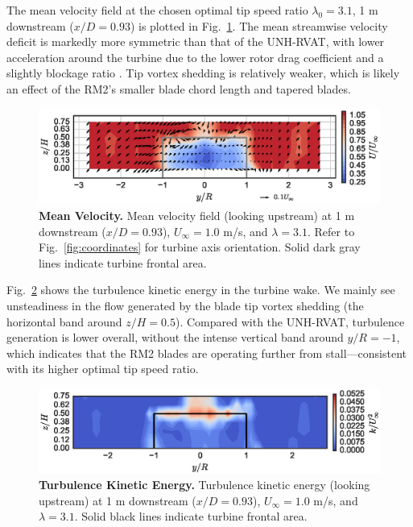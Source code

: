 \documentclass[10pt,letterpaper]{article}
\begin{document}
The mean velocity field at the chosen optimal tip speed ratio $\lambda_0=3.1$, 1
m downstream ($x/D=0.93$) is plotted in Fig.~\ref{fig:meancontquiv}. The mean
streamwise velocity deficit is markedly more symmetric than that of the
UNH-RVAT, with lower acceleration around the turbine due to the lower rotor drag
coefficient and a slightly blockage ratio \cite{Bachant2015-JoT}. Tip vortex
shedding is relatively weaker, which is likely an effect of the RM2's smaller
blade chord length and tapered blades.

\begin{figure}[h]
    \includegraphics[width=\textwidth]{figures/meancontquiv.eps}

    \caption{{\bf Mean Velocity.} Mean velocity field (looking upstream) at 1 m
    downstream ($x/D=0.93$), $U_\infty=1.0$ m/s, and $\lambda=3.1$. Refer to
    Fig.~\ref{fig:coordinates} for turbine axis orientation. Solid dark gray
    lines indicate turbine frontal area.}

    \label{fig:meancontquiv}
\end{figure}

Fig.~\ref{fig:kcont} shows the turbulence kinetic energy in the turbine wake. We
mainly see unsteadiness in the flow generated by the blade tip vortex shedding
(the horizontal band around $z/H=0.5$). Compared with the UNH-RVAT, turbulence
generation is lower overall, without the intense vertical band around $y/R=-1$,
which indicates that the RM2 blades are operating further from
stall---consistent with its higher optimal tip speed ratio.

\begin{figure}[h]
    \includegraphics[width=\textwidth]{figures/k_contours.eps}

    \caption{{\bf Turbulence Kinetic Energy.} Turbulence kinetic energy (looking
    upstream) at 1 m downstream ($x/D=0.93$), $U_\infty=1.0$ m/s, and
    $\lambda=3.1$. Solid black lines indicate turbine frontal area.}

    \label{fig:kcont}
\end{figure}
\end{document}
